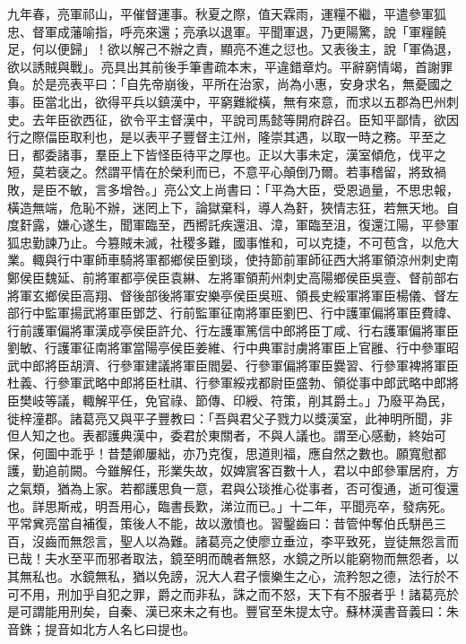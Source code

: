 \begin{pinyinscope}
九年春，亮軍祁山，平催督運事。秋夏之際，值天霖雨，運糧不繼，平遣參軍狐忠、督軍成藩喻指，呼亮來還；亮承以退軍。平聞軍退，乃更陽驚，說「軍糧饒足，何以便歸」！欲以解己不辦之責，顯亮不進之愆也。又表後主，說「軍偽退，欲以誘賊與戰」。亮具出其前後手筆書疏本末，平違錯章灼。平辭窮情竭，首謝罪負。於是亮表平曰：「自先帝崩後，平所在治家，尚為小惠，安身求名，無憂國之事。臣當北出，欲得平兵以鎮漢中，平窮難縱橫，無有來意，而求以五郡為巴州刺史。去年臣欲西征，欲令平主督漢中，平說司馬懿等開府辟召。臣知平鄙情，欲因行之際偪臣取利也，是以表平子豐督主江州，隆崇其遇，以取一時之務。平至之日，都委諸事，羣臣上下皆怪臣待平之厚也。正以大事未定，漢室傾危，伐平之短，莫若襃之。然謂平情在於榮利而已，不意平心顛倒乃爾。若事稽留，將致禍敗，是臣不敏，言多增咎。」亮公文上尚書曰：「平為大臣，受恩過量，不思忠報，橫造無端，危恥不辦，迷罔上下，論獄棄科，導人為姧，狹情志狂，若無天地。自度姧露，嫌心遂生，聞軍臨至，西嚮託疾還沮、漳，軍臨至沮，復還江陽，平參軍狐忠勤諫乃止。今篡賊未滅，社稷多難，國事惟和，可以克捷，不可苞含，以危大業。輙與行中軍師車騎將軍都鄉侯臣劉琰，使持節前軍師征西大將軍領涼州刺史南鄭侯臣魏延、前將軍都亭侯臣袁綝、左將軍領荊州刺史高陽鄉侯臣吳壹、督前部右將軍玄鄉侯臣高翔、督後部後將軍安樂亭侯臣吳班、領長史綏軍將軍臣楊儀、督左部行中監軍揚武將軍臣鄧芝、行前監軍征南將軍臣劉巴、行中護軍偏將軍臣費禕、行前護軍偏將軍漢成亭侯臣許允、行左護軍篤信中郎將臣丁咸、行右護軍偏將軍臣劉敏、行護軍征南將軍當陽亭侯臣姜維、行中典軍討虜將軍臣上官雝、行中參軍昭武中郎將臣胡濟、行參軍建議將軍臣閻晏、行參軍偏將軍臣爨習、行參軍裨將軍臣杜義、行參軍武略中郎將臣杜祺、行參軍綏戎都尉臣盛勃、領從事中郎武略中郎將臣樊岐等議，輙解平任，免官祿、節傳、印綬、符策，削其爵土。」乃廢平為民，徙梓潼郡。諸葛亮又與平子豐教曰：「吾與君父子戮力以獎漢室，此神明所聞，非但人知之也。表都護典漢中，委君於東關者，不與人議也。謂至心感動，終始可保，何圖中乖乎！昔楚卿屢絀，亦乃克復，思道則福，應自然之數也。願寬慰都護，勤追前闕。今雖解任，形業失故，奴婢賔客百數十人，君以中郎參軍居府，方之氣類，猶為上家。若都護思負一意，君與公琰推心從事者，否可復通，逝可復還也。詳思斯戒，明吾用心，臨書長歎，涕泣而已。」十二年，平聞亮卒，發病死。平常兾亮當自補復，策後人不能，故以激憤也。習鑿齒曰：昔管仲奪伯氏駢邑三百，沒齒而無怨言，聖人以為難。諸葛亮之使廖立垂泣，李平致死，豈徒無怨言而已哉！夫水至平而邪者取法，鏡至明而醜者無怒，水鏡之所以能窮物而無怨者，以其無私也。水鏡無私，猶以免謗，況大人君子懷樂生之心，流矜恕之德，法行於不可不用，刑加乎自犯之罪，爵之而非私，誅之而不怒，天下有不服者乎！諸葛亮於是可謂能用刑矣，自秦、漢已來未之有也。豐官至朱提太守。蘇林漢書音義曰：朱音銖；提音如北方人名匕曰提也。


\end{pinyinscope}